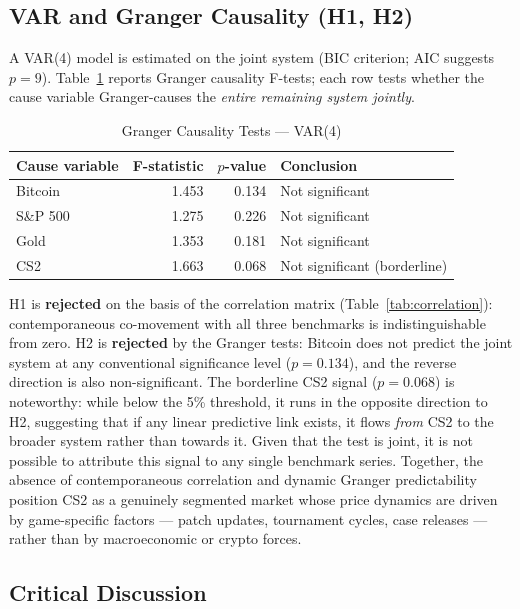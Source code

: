 \subsection{VAR and Granger Causality (H1, H2)}

A VAR(4) model is estimated on the joint system (BIC criterion; AIC suggests
$p = 9$). Table~\ref{tab:granger} reports Granger causality F-tests; each row
tests whether the cause variable Granger-causes the \emph{entire remaining
system jointly}.

\begin{table}[H]
\centering
\caption{Granger Causality Tests --- VAR(4)}
\label{tab:granger}
\begin{tabular}{lrrl}
\hline
Cause variable & F-statistic & $p$-value & Conclusion \\
\hline
Bitcoin  & 1.453 & 0.134 & Not significant \\
S\&P 500 & 1.275 & 0.226 & Not significant \\
Gold     & 1.353 & 0.181 & Not significant \\
CS2      & 1.663 & 0.068 & Not significant (borderline) \\
\hline
\end{tabular}
\end{table}

H1 is \textbf{rejected} on the basis of the correlation matrix (Table~\ref{tab:correlation}):
contemporaneous co-movement with all three benchmarks is indistinguishable from
zero. H2 is \textbf{rejected} by the Granger tests: Bitcoin does not predict
the joint system at any conventional significance level ($p = 0.134$), and the
reverse direction is also non-significant. The borderline CS2 signal ($p =
0.068$) is noteworthy: while below the 5\% threshold, it runs in the opposite
direction to H2, suggesting that if any linear predictive link exists, it flows
\emph{from} CS2 to the broader system rather than towards it. Given that the
test is joint, it is not possible to attribute this signal to any single
benchmark series. Together, the absence of contemporaneous correlation and
dynamic Granger predictability position CS2 as a genuinely segmented market
whose price dynamics are driven by game-specific factors --- patch updates,
tournament cycles, case releases --- rather than by macroeconomic or crypto
forces.

\subsection{Critical Discussion}

